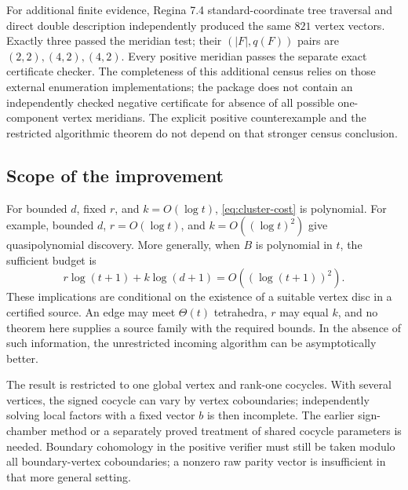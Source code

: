 For additional finite evidence, Regina 7.4 standard-coordinate tree
traversal and direct double description independently produced the same
$821$ vertex vectors.  Exactly three passed the meridian test; their
$(|F|,q(F))$ pairs are $(2,2),(4,2),(4,2)$.  Every positive meridian
passes the separate exact certificate checker.  The completeness of
this additional census relies on those external enumeration
implementations; the package does not contain an independently checked
negative certificate for absence of all possible one-component vertex
meridians.  The explicit positive counterexample and the restricted
algorithmic theorem do not depend on that stronger census conclusion.

\subsection{Scope of the improvement}

For bounded $d$, fixed $r$, and $k=O(\log t)$,
\eqref{eq:cluster-cost} is polynomial.  For example, bounded $d$,
$r=O(\log t)$, and $k=O((\log t)^2)$ give quasipolynomial discovery.
More generally, when $B$ is polynomial in $t$, the sufficient budget is
\[
       r\log(t+1)+k\log(d+1)=O((\log(t+1))^2).
\]
These implications are conditional on the existence of a suitable
vertex disc in a certified source.  An edge may meet $\Theta(t)$
tetrahedra, $r$ may equal $k$, and no theorem here supplies a source
family with the required bounds.  In the absence of such information,
the unrestricted incoming algorithm can be asymptotically better.

The result is restricted to one global vertex and rank-one cocycles.
With several vertices, the signed cocycle can vary by vertex
coboundaries; independently solving local factors with a fixed vector
$b$ is then incomplete.  The earlier sign-chamber method or a separately
proved treatment of shared cocycle parameters is needed.  Boundary
cohomology in the positive verifier must still be taken modulo all
boundary-vertex coboundaries; a nonzero raw parity vector is insufficient
in that more general setting.
